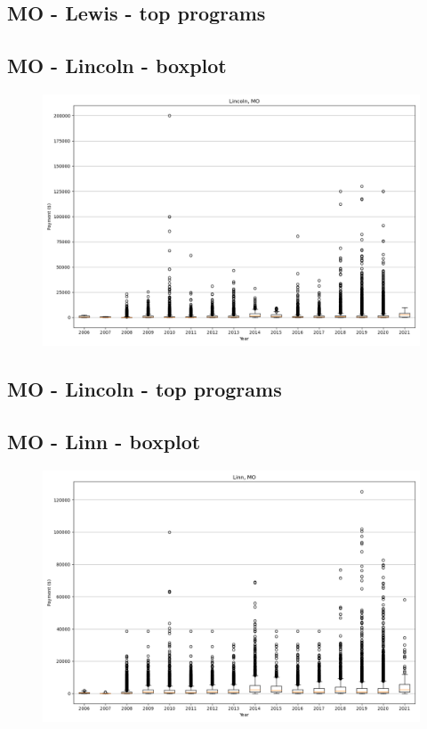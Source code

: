 \subsection*{MO - Lewis - top programs}

\newpage
\subsection*{MO - Lincoln - boxplot}
\begin{figure}[h]
\centering
\includegraphics[width=7in]{../output/boxplots/counties/Lincoln-MO_boxplot.png}
\end{figure}


\subsection*{MO - Lincoln - top programs}

\newpage
\subsection*{MO - Linn - boxplot}
\begin{figure}[h]
\centering
\includegraphics[width=7in]{../output/boxplots/counties/Linn-MO_boxplot.png}
\end{figure}


